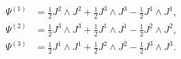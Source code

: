 \begin{equation}
\begin{aligned}
   \Psi^{(1)} &= \tfrac{1}{2}J^2\wedge J^2 + \tfrac{1}{2}J^3\wedge J^3 
      - \tfrac{1}{2}J^1\wedge J^1 , \\
   \Psi^{(2)} &= \tfrac{1}{2}J^3\wedge J^3 + \tfrac{1}{2}J^1\wedge J^1  
      - \tfrac{1}{2}J^2\wedge J^2 , \\
   \Psi^{(3)} &= \tfrac{1}{2}J^1\wedge J^1 + \tfrac{1}{2}J^2\wedge J^2 
      - \tfrac{1}{2}J^3\wedge J^3 .
\end{aligned}
\end{equation}

